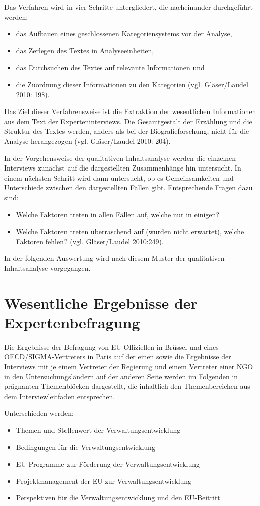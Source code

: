 Das Verfahren wird in vier Schritte untergliedert, die nacheinander durchgeführt werden:
\begin{itemize}
\item das Aufbauen eines geschlossenen Kategoriensystems vor der Analyse,
\item das Zerlegen des Textes in Analyseeinheiten,
\item das Durchsuchen des Textes auf relevante Informationen und
\item die Zuordnung dieser Informationen zu den Kategorien (vgl. Gläser/Laudel 2010: 198).
\end{itemize}
Das Ziel dieser Verfahrensweise ist die Extraktion der wesentlichen Informationen aus dem Text der Experteninterviews. Die Gesamtgestalt der Erzählung und die Struktur des Textes werden, anders als bei der Biografieforschung, nicht für die Analyse herangezogen (vgl. Gläser/Laudel 2010: 204).\par
In der Vorgehensweise der qualitativen Inhaltsanalyse werden die einzelnen Interviews zunächst auf die dargestellten Zusammenhänge hin untersucht. In einem nächsten Schritt wird dann untersucht, ob es Gemeinsamkeiten und Unterschiede zwischen den dargestellten Fällen gibt. Entsprechende Fragen dazu sind:
\begin{itemize}
\item Welche Faktoren treten in allen Fällen auf, welche nur in einigen?
\item Welche Faktoren treten überraschend auf (wurden nicht erwartet), welche Faktoren fehlen? (vgl. Gläser/Laudel 2010:249).
\end{itemize}
In der folgenden Auswertung wird nach diesem Muster der qualitativen Inhaltsanalyse vorgegangen.

\section{Wesentliche Ergebnisse der Expertenbefragung }
Die Ergebnisse der Befragung von EU-Offiziellen in Brüssel und eines OECD/SIGMA-Vertreters in Paris auf der einen sowie die Ergebnisse der Interviews mit je einem Vertreter der Regierung und einem Vertreter einer NGO in den Untersuchungsländern auf der anderen Seite werden im Folgenden in prägnanten Themenblöcken dargestellt, die inhaltlich den Themenbereichen aus dem Interviewleitfaden entsprechen.\par

Unterschieden werden:
\begin{itemize}
\item Themen und Stellenwert der Verwaltungsentwicklung
\item Bedingungen für die Verwaltungsentwicklung
\item EU-Programme zur Förderung der Verwaltungsentwicklung
\item Projektmanagement der EU zur Verwaltungsentwicklung
\item Perspektiven für die Verwaltungsentwicklung und den EU-Beitritt
\end{itemize}
